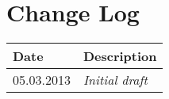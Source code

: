 \section{Change Log}
\label{sec:changelog}
\begin{tabular}{|l|l|}
\hline
Date & Description \\ \hline
05.03.2013 & \emph{Initial draft\/} \\ \hline
\end{tabular}
